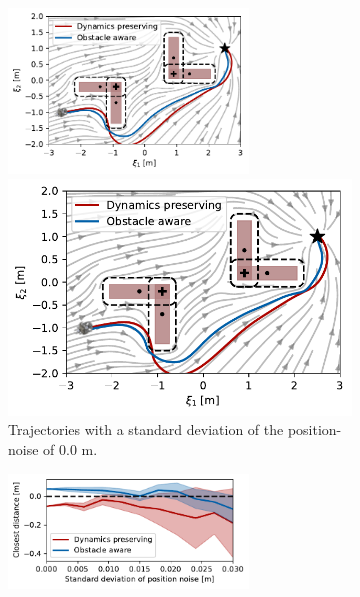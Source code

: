 \begin{figure}[htbp]
    \centering
    \begin{subfigure}{\columnwidth}
	\centering
	\ifthesis
    \centerline{\includegraphics[width=0.7\textwidth]{figures/trajectory_position_noise}}
	\else
    \centerline{\includegraphics[width=\textwidth]{figures/trajectory_position_noise}}
	\fi
    \caption{Trajectories with a standard deviation of the position-noise of 0.0 m.}
    \label{fig:trajectory_position_noise}
    \end{subfigure}
    \begin{subfigure}{\columnwidth}
	\centering
	\ifthesis
    \includegraphics[width=0.7\textwidth]{figures/comparison_position_noise}

\end{subfigure}
\end{figure}
